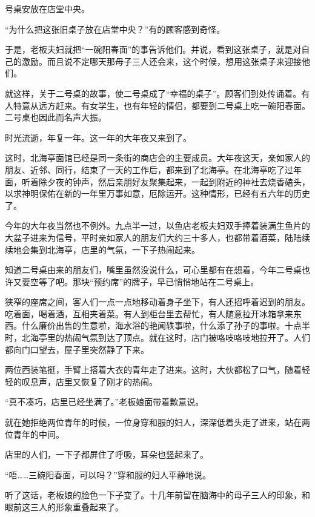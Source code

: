 \documentclass[UTF8,a4paper,8pt]{ctexbook}
\begin{document}
			  号桌安放在店堂中央。
			  
			  “为什么把这张旧桌子放在店堂中央？”有的顾客感到奇怪。
			  
			  于是，老板夫妇就把“一碗阳春面”的事告诉他们。并说，看到这张桌子，就是对自己的激励。而且说不定哪天那母子三人还会来，这个时候，想用这张桌子来迎接他们。
			  
			  就这样，关于二号桌的故事，使二号桌成了“幸福的桌子”。顾客们到处传诵着。有人特意从远方赶来。有女学生，也有年轻的情侣，都要到二号桌上吃一碗阳春面。二号桌也因此而名声大振。
			  
			  
			  
			  时光流逝，年复一年。这一年的大年夜又来到了。
			  
			  这时，北海亭面馆已经是同一条街的商店会的主要成员。大年夜这天，亲如家人的朋友、近邻、同行，结束了一天的工作后，都来到了北海亭。在北海亭吃了过年面，听着除夕夜的钟声，然后亲朋好友聚集起来，一起到附近的神社去烧香磕头，以求神明保佑在新的一年里万事如意，厄除运开。这种情形，已经有五六年的历史了。
			  
			  今年的大年夜当然也不例外。九点半一过，以鱼店老板夫妇双手捧着装满生鱼片的大盆子进来为信号，平时亲如家人的朋友们大约三十多人，也都带着酒菜，陆陆续续地会集到北海亭，店里的气氛，一下子热闹起来。
			  
			  知道二号桌由来的朋友们，嘴里虽然没说什么，可心里都有在想着，今年二号桌也许又要空等了吧。那块“预约席”的牌子，早已悄悄地站在二号桌上。
			  
			  狭窄的座席之间，客人们一点一点地移动着身子坐下，有人还招呼着迟到的朋友。吃着面，喝着酒，互相夹着菜。有人到柜台里去帮忙，有人随意拉开冰箱拿来东西。什么廉价出售的生意啦，海水浴的艳闻轶事啦，什么添了孙子的事啦。十点半时，北海亭里的热闹气氛到达了顶点。就在这时，店门被咯吱咯吱地拉开了。人们都向门口望去，屋子里突然静了下来。
			  
			  两位西装笔挺，手臂上搭着大衣的青年走了进来。这时，大伙都松了口气，随着轻轻的叹息声，店里又恢复了刚才的热闹。
			  
			  “真不凑巧，店里已经坐满了。”老板娘面带着歉意说。
			  
			  就在她拒绝两位青年的时候，一位身穿和服的妇人，深深低着头走了进来，站在两位青年的中间。
			  
			  店里的人们，一下子都屏住了呼吸，耳朵也竖起来了。
			  
			  “唔……三碗阳春面，可以吗？”穿和服的妇人平静地说。
			  
			  听了这话，老板娘的脸色一下子变了。十几年前留在脑海中的母子三人的印象，和眼前这三人的形象重叠起来了。
			  
\end{document}
